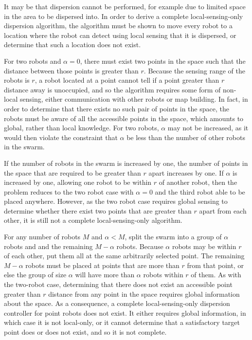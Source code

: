 It may be that dispersion cannot be performed, for example due to limited space in the area to be dispersed into. 
In order to derive a complete local-sensing-only dispersion algorithm, the algorithm must be shown to move every robot to a location where the robot can detect using local sensing that it is dispersed, or determine that such a location does not exist.

For two robots and $\alpha = 0$, there must exist two points in the space such that the distance between those points is greater than $r$. 
Because the sensing range of the robots is $r$, a robot located at a point cannot tell if a point greater than $r$ distance away is unoccupied, and so the algorithm requires some form of non-local sensing, either communication with other robots or map building. 
In fact, in order to determine that there exists no such pair of points in the space, the robots must be aware of all the accessible points in the space, which amounts to global, rather than local knowledge. %
For two robots, $\alpha$ may not be increased, as it would then violate the constraint that $\alpha$ be less than the number of other robots in the swarm. 

If the number of robots in the swarm is increased by one, the number of points in the space that are required to be greater than $r$ apart increases by one. 
If $\alpha$ is increased by one, allowing one robot to be within $r$ of another robot, then the problem reduces to the two robot case with $\alpha=0$ and the third robot able to be placed anywhere. 
However, as the two robot case requires global sensing to determine whether there exist two points that are greater than $r$ apart from each other, it is still not a complete local-sensing-only algorithm. 

For any number of robots $M$ and $\alpha < M$, split the swarm into a group of $\alpha$ robots and and the remaining $M - \alpha$ robots. 
Because $\alpha$ robots may be within $r$ of each other, put them all at the same arbitrarily selected point. 
The remaining $M - \alpha$ robots must be placed at points that are more than $r$ from that point, or else the group of size $\alpha$ will have more than $\alpha$ robots within $r$ of them.
As with the two-robot case, determining that there does not exist an accessible point greater than $r$ distance from any point in the space requires global information about the space. 
As a consequence, a complete local-sensing-only dispersion controller for point robots does not exist.
It either requires global information, in which case it is not local-only, or it cannot determine that a satisfactory target point does or does not exist, and so it is not complete.

